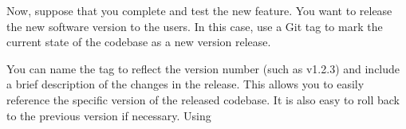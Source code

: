 Now, suppose that you complete and test the new feature. You want to release the new software version to the users. In this case, use a Git tag to mark the current state of the codebase as a new version release.

You can name the tag to reflect the version number (such as v1.2.3) and include a brief description of the changes in the release. This allows you to easily reference the specific version of the released codebase. It is also easy to roll back to the previous version if necessary.
Using 